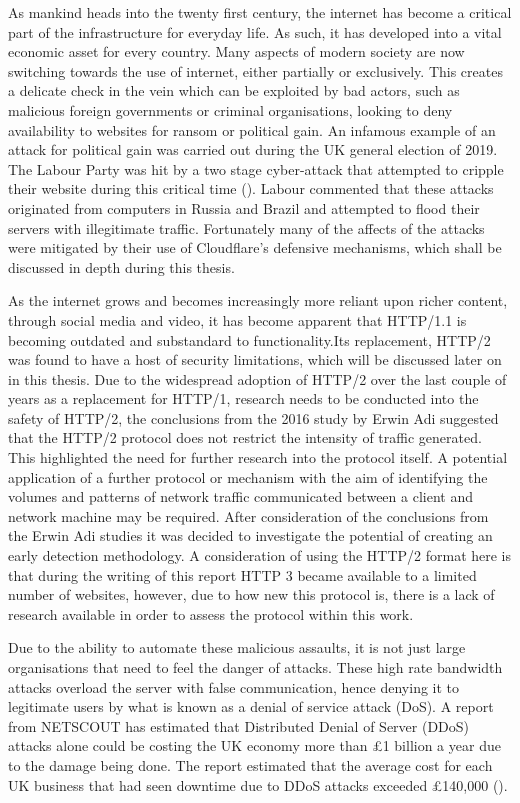 
As mankind heads into the twenty first century, the internet has become a critical part of the infrastructure for everyday life. As such, it has developed into a vital economic asset for every country. Many aspects of modern society are now switching towards the use of internet, either partially or exclusively. This creates a delicate check in the vein which can be exploited by bad actors, such as malicious foreign governments or criminal organisations, looking to deny availability to websites for ransom or political gain. An infamous example of an attack for political gain was carried out during the UK general election of 2019. The Labour Party was hit by a two stage cyber-attack that attempted to cripple their website during this critical time (\cite{Labour}). Labour commented that these attacks originated from computers in Russia and Brazil and attempted to flood their servers with illegitimate traffic. Fortunately many of the affects of the attacks were mitigated by their use of Cloudflare's defensive mechanisms, which shall be discussed in depth during this thesis.


As the internet grows and becomes increasingly more reliant upon richer content, through social media and video, it has become apparent that HTTP/1.1 is becoming outdated and substandard to functionality.Its replacement, HTTP/2 was found to have a host of security limitations, which will be discussed later on in this thesis. Due to the widespread adoption of HTTP/2 over the last couple of years as a replacement for HTTP/1, research needs to be conducted into the safety of HTTP/2, the conclusions from the 2016 study by Erwin Adi suggested that the HTTP/2 protocol does not restrict the intensity of traffic generated. This highlighted the need for further research into the protocol itself. A potential application of a further protocol or mechanism with the aim of identifying the volumes and patterns of network traffic communicated between a client and network machine may be required. After consideration of the conclusions from the Erwin Adi studies it was decided to investigate the potential of creating an early detection methodology. A consideration of using the HTTP/2 format here is that during the writing of this report HTTP 3 became available to a limited number of websites, however, due to how new this protocol is, there is a lack of research available in order to assess the protocol within this work.


Due to the ability to automate these malicious assaults, it is not just large organisations that need to feel the danger of attacks. These high rate bandwidth attacks overload the server with false communication, hence denying it to legitimate users by what is known as a denial of service attack (DoS). A report from NETSCOUT has estimated that Distributed Denial of Server (DDoS) attacks alone could be costing the UK economy more than £1 billion a year due to the damage being done. The report estimated that the average cost for each UK business that had seen downtime due to DDoS attacks exceeded £140,000 (\cite{Costs}).

